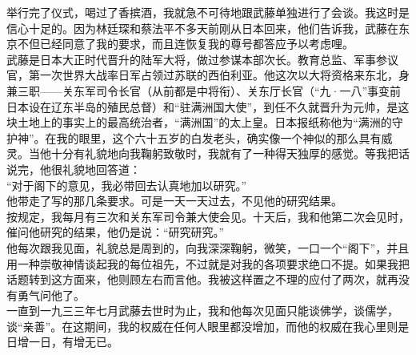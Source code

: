 举行完了仪式，喝过了香摈酒，我就急不可待地跟武藤单独进行了会谈。我这时是信心十足的。因为林廷琛和蔡法平不多天前刚从日本回来，他们告诉我，武藤在东京不但已经同意了我的要求，而且连恢复我的尊号都答应予以考虑哩。\\

武藤是日本大正时代晋升的陆军大将，做过参谋本部次长。教育总监、军事参议官，第一次世界大战率日军占领过苏联的西伯利亚。他这次以大将资格来东北，身兼三职——关东军司令长官（从前都是中将衔）、关东厅长官（“九·一八”事变前日本设在辽东半岛的殖民总督）和“驻满洲国大使”，到任不久就晋升为元帅，是这块土地上的事实上的最高统治者，“满洲国”的太上皇。日本报纸称他为“满洲的守护神”。在我的眼里，这个六十五岁的白发老头，确实像一个神似的那么具有威灵。当他十分有礼貌地向我鞠躬致敬时，我就有了一种得天独厚的感觉。等我把话说完，他很礼貌地回答道：\\

“对于阁下的意见，我必带回去认真地加以研究。”\\

他带走了写的那几条要求。可是一天一天过去，不见他的研究结果。\\

按规定，我每月有三次和关东军司令兼大使会见。十天后，我和他第二次会见时，催问他研究的结果，他仍是说：“研究研究。”\\

他每次跟我见面，礼貌总是周到的，向我深深鞠躬，微笑，一口一个“阁下”，并且用一种崇敬神情谈起我的每位祖先，不过就是对我的各项要求绝口不提。如果我把话题转到这方面来，他则顾左右而言他。我被这样置之不理的应付了两次，就再没有勇气问他了。\\

一直到一九三三年七月武藤去世时为止，我和他每次见面只能谈佛学，谈儒学，谈“亲善”。在这期间，我的权威在任何人眼里都没增加，而他的权威在我心里则是日增一日，有增无已。